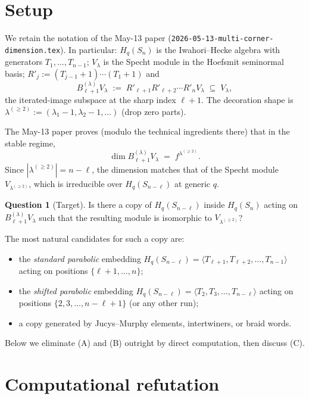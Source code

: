 \documentclass[11pt]{article}
\theoremstyle{definition}
\newtheorem{question}[theorem]{Question}
\begin{document}
\section{Setup}\label{sec:setup}

We retain the notation of the May-13 paper (\texttt{2026-05-13-multi-corner-dimension.tex}).
In particular: $H_q(S_n)$ is the Iwahori--Hecke algebra with generators
$T_1, \ldots, T_{n-1}$; $V_\lambda$ is the Specht module in the
Hoefsmit seminormal basis; $R'_j := (T_{j-1}+1)\cdots(T_1+1)$ and
\[
   B_{\ell+1}^{(\lambda)} V_\lambda \;:=\; R'_{\ell+1}R'_{\ell+2}\cdots R'_n V_\lambda
   \;\subseteq\; V_\lambda,
\]
the iterated-image subspace at the sharp index $\ell + 1$. The
decoration shape is $\lambda^{(\ge 2)} := (\lambda_1-1, \lambda_2-1, \ldots)$
(drop zero parts).

\medskip
The May-13 paper proves (modulo the technical ingredients there) that
in the stable regime,
\[
   \dim B_{\ell+1}^{(\lambda)} V_\lambda \;=\; f^{\lambda^{(\ge 2)}}.
\]
Since $|\lambda^{(\ge 2)}| = n - \ell$, the dimension matches that of
the Specht module $V_{\lambda^{(\ge 2)}}$, which is irreducible over
$H_q(S_{n-\ell})$ at generic $q$.

\begin{question}[Target]\label{q:target}
Is there a copy of $H_q(S_{n-\ell})$ inside $H_q(S_n)$ acting on
$B_{\ell+1}^{(\lambda)} V_\lambda$ such that the resulting module is
isomorphic to $V_{\lambda^{(\ge 2)}}$?
\end{question}

\noindent
The most natural candidates for such a copy are:
\begin{itemize}[leftmargin=2em,topsep=0.2em,itemsep=0.1em]
\item[(A)] the \emph{standard parabolic} embedding
$H_q(S_{n-\ell}) = \langle T_{\ell+1}, T_{\ell+2}, \ldots, T_{n-1}\rangle$
acting on positions $\{\ell + 1, \ldots, n\}$;
\item[(B)] the \emph{shifted parabolic} embedding
$H_q(S_{n-\ell}) = \langle T_2, T_3, \ldots, T_{n-\ell}\rangle$ acting on positions
$\{2, 3, \ldots, n - \ell + 1\}$ (or any other run);
\item[(C)] a copy generated by Jucys--Murphy elements, intertwiners, or
braid words.
\end{itemize}
Below we eliminate (A) and (B) outright by direct computation, then
discuss (C).

\section{Computational refutation}\label{sec:refute}
\end{document}
